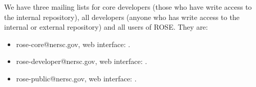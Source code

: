 %

We have three mailing lists for core developers (those who have write access to
the internal repository), all developers (anyone who has write access to the
internal or external repository) and all
users of ROSE. They are:
\begin{itemize}
\item rose-core@nersc.gov, web interface: 
.
\item rose-developer@nersc.gov, web interface: 
.
\item rose-public@nersc.gov, web interface:
.
\end{itemize}
